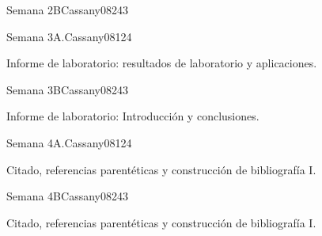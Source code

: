 \begin{syllabus}
\begin{unit}{Semana 2B}{Cassany08}{24}{3}
   \begin{unitgoals}
      \item 
      \item
      \item 
      \end{unitgoals}
\end{unit}

\begin{unit}{Semana 3A.}{Cassany08}{12}{4}
   \begin{topics}
      \item Informe de laboratorio: resultados de laboratorio y aplicaciones. 
   \end{topics}
   \begin{unitgoals}
      \item 
   \end{unitgoals}
\end{unit}

\begin{unit}{Semana 3B}{Cassany08}{24}{3}
   \begin{topics}
      \item Informe de laboratorio: Introducción y conclusiones. 
   \end{topics}

   \begin{unitgoals}
      \item 
      \item
      \item 
      \end{unitgoals}
\end{unit}

\begin{unit}{Semana 4A.}{Cassany08}{12}{4}
   \begin{topics}
      \item Citado, referencias parentéticas y construcción de bibliografía I. 
   \end{topics}
   \begin{unitgoals}
      \item 
   \end{unitgoals}
\end{unit}

\begin{unit}{Semana 4B}{Cassany08}{24}{3}
   \begin{topics}
      \item Citado, referencias parentéticas y construcción de bibliografía I.
   \end{topics}


\end{unit}
\end{syllabus}
